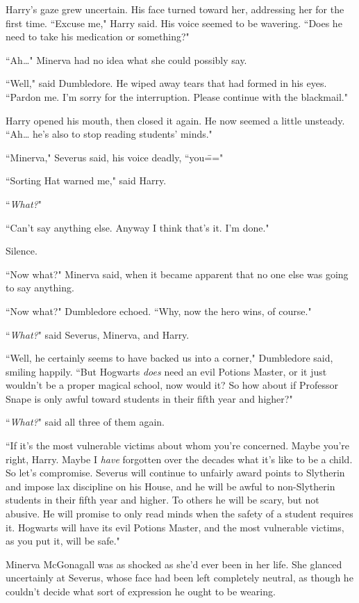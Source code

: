 Harry's gaze grew uncertain. His face turned toward her, addressing her for the first time. ``Excuse me," Harry said. His voice seemed to be wavering. ``Does he need to take his medication or something?"

``Ah{\ldots}" Minerva had no idea what she could possibly say.

``Well," said Dumbledore. He wiped away tears that had formed in his eyes. ``Pardon me. I'm sorry for the interruption. Please continue with the blackmail."

Harry opened his mouth, then closed it again. He now seemed a little unsteady. ``Ah{\ldots} he's also to stop reading students' minds."

``Minerva," Severus said, his voice deadly, ``you\==="

``Sorting Hat warned me," said Harry.

``\emph{What?}"

``Can't say anything else. Anyway I think that's it. I'm done."

Silence.

``Now what?" Minerva said, when it became apparent that no one else was going to say anything.

``Now what?" Dumbledore echoed. ``Why, now the hero wins, of course."

``\emph{What?}" said Severus, Minerva, and Harry.

``Well, he certainly seems to have backed us into a corner," Dumbledore said, smiling happily. ``But Hogwarts \emph{does} need an evil Potions Master, or it just wouldn't be a proper magical school, now would it? So how about if Professor Snape is only awful toward students in their fifth year and higher?"

``\emph{What?}" said all three of them again.

``If it's the most vulnerable victims about whom you're concerned. Maybe you're right, Harry. Maybe I \emph{have} forgotten over the decades what it's like to be a child. So let's compromise. Severus will continue to unfairly award points to Slytherin and impose lax discipline on his House, and he will be awful to non-Slytherin students in their fifth year and higher. To others he will be scary, but not abusive. He will promise to only read minds when the safety of a student requires it. Hogwarts will have its evil Potions Master, and the most vulnerable victims, as you put it, will be safe."

Minerva McGonagall was as shocked as she'd ever been in her life. She glanced uncertainly at Severus, whose face had been left completely neutral, as though he couldn't decide what sort of expression he ought to be wearing.

